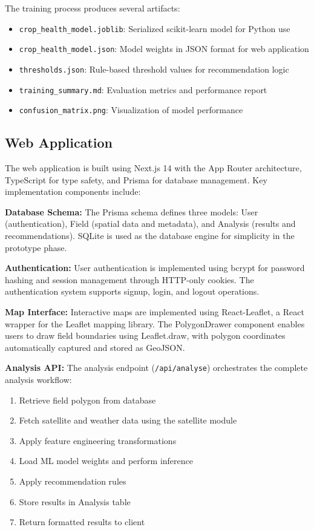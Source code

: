 \documentclass[journal]{IEEEtran}
\begin{document}
The training process produces several artifacts:
\begin{itemize}
\item \texttt{crop\_health\_model.joblib}: Serialized scikit-learn model for Python use
\item \texttt{crop\_health\_model.json}: Model weights in JSON format for web application
\item \texttt{thresholds.json}: Rule-based threshold values for recommendation logic
\item \texttt{training\_summary.md}: Evaluation metrics and performance report
\item \texttt{confusion\_matrix.png}: Visualization of model performance
\end{itemize}

\subsection{Web Application}

The web application is built using Next.js 14 with the App Router architecture, TypeScript for type safety, and Prisma for database management. Key implementation components include:

\textbf{Database Schema:} The Prisma schema defines three models: User (authentication), Field (spatial data and metadata), and Analysis (results and recommendations). SQLite is used as the database engine for simplicity in the prototype phase.

\textbf{Authentication:} User authentication is implemented using bcrypt for password hashing and session management through HTTP-only cookies. The authentication system supports signup, login, and logout operations.

\textbf{Map Interface:} Interactive maps are implemented using React-Leaflet, a React wrapper for the Leaflet mapping library. The PolygonDrawer component enables users to draw field boundaries using Leaflet.draw, with polygon coordinates automatically captured and stored as GeoJSON.

\textbf{Analysis API:} The analysis endpoint (\texttt{/api/analyse}) orchestrates the complete analysis workflow:
\begin{enumerate}
\item Retrieve field polygon from database
\item Fetch satellite and weather data using the satellite module
\item Apply feature engineering transformations
\item Load ML model weights and perform inference
\item Apply recommendation rules
\item Store results in Analysis table
\item Return formatted results to client
\end{enumerate}
\end{document}
